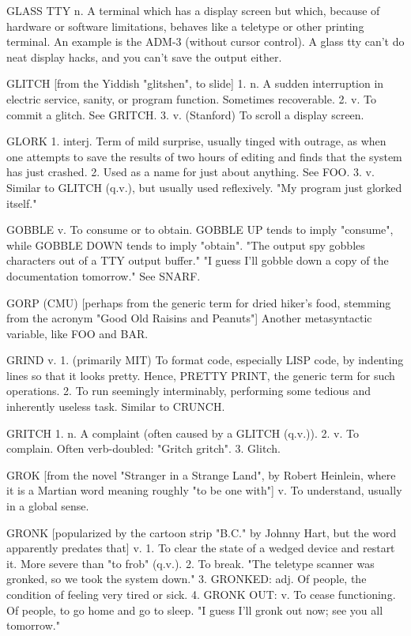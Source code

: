GLASS TTY n. A terminal which has a display screen but which, because
   of hardware or software limitations, behaves like a teletype or
   other printing terminal.  An example is the ADM-3 (without cursor
   control).  A glass tty can't do neat display hacks, and you can't
   save the output either.

GLITCH [from the Yiddish "glitshen", to slide] 1. n. A sudden
   interruption in electric service, sanity, or program function.
   Sometimes recoverable.  2. v. To commit a glitch.  See GRITCH.
   3. v. (Stanford) To scroll a display screen.

GLORK 1. interj. Term of mild surprise, usually tinged with outrage,
   as when one attempts to save the results of two hours of editing
   and finds that the system has just crashed.	2. Used as a name for
   just about anything.	 See FOO.  3. v. Similar to GLITCH (q.v.), but
   usually used reflexively.  "My program just glorked itself."

GOBBLE v. To consume or to obtain.  GOBBLE UP tends to imply
   "consume", while GOBBLE DOWN tends to imply "obtain".  "The output
   spy gobbles characters out of a TTY output buffer."	"I guess I'll
   gobble down a copy of the documentation tomorrow."  See SNARF.

GORP (CMU) [perhaps from the generic term for dried hiker's food,
   stemming from the acronym "Good Old Raisins and Peanuts"] Another
   metasyntactic variable, like FOO and BAR.

GRIND v. 1. (primarily MIT) To format code, especially LISP code, by
   indenting lines so that it looks pretty.  Hence, PRETTY PRINT, the
   generic term for such operations.  2. To run seemingly
   interminably, performing some tedious and inherently useless task.
   Similar to CRUNCH.

GRITCH 1. n. A complaint (often caused by a GLITCH (q.v.)).  2. v. To
   complain.  Often verb-doubled: "Gritch gritch".  3. Glitch.

GROK [from the novel "Stranger in a Strange Land", by Robert Heinlein,
   where it is a Martian word meaning roughly "to be one with"] v. To
   understand, usually in a global sense.

GRONK [popularized by the cartoon strip "B.C." by Johnny Hart, but the
   word apparently predates that] v. 1. To clear the state of a wedged
   device and restart it.  More severe than "to frob" (q.v.).  2. To
   break.  "The teletype scanner was gronked, so we took the system
   down."  3. GRONKED: adj. Of people, the condition of feeling very
   tired or sick.  4. GRONK OUT: v. To cease functioning.  Of people,
   to go home and go to sleep.	"I guess I'll gronk out now; see you
   all tomorrow."

